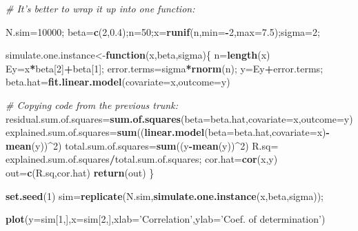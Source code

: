 \documentclass[12pt,]{book}
\newenvironment{Shaded}{\begin{snugshade}}{\end{snugshade}}
\newcommand{\KeywordTok}[1]{\textcolor[rgb]{0.13,0.29,0.53}{\textbf{#1}}}
\newcommand{\DataTypeTok}[1]{\textcolor[rgb]{0.13,0.29,0.53}{#1}}
\newcommand{\DecValTok}[1]{\textcolor[rgb]{0.00,0.00,0.81}{#1}}
\newcommand{\FloatTok}[1]{\textcolor[rgb]{0.00,0.00,0.81}{#1}}
\newcommand{\StringTok}[1]{\textcolor[rgb]{0.31,0.60,0.02}{#1}}
\newcommand{\CommentTok}[1]{\textcolor[rgb]{0.56,0.35,0.01}{\textit{#1}}}
\newcommand{\ControlFlowTok}[1]{\textcolor[rgb]{0.13,0.29,0.53}{\textbf{#1}}}
\newcommand{\OperatorTok}[1]{\textcolor[rgb]{0.81,0.36,0.00}{\textbf{#1}}}
\newcommand{\NormalTok}[1]{#1}
\begin{document}
\begin{Shaded}
\begin{Highlighting}[]
\CommentTok{# It's better to wrap it up into one function:}

\NormalTok{N.sim=}\DecValTok{10000}\NormalTok{;}
\NormalTok{beta=}\KeywordTok{c}\NormalTok{(}\DecValTok{2}\NormalTok{,}\FloatTok{0.4}\NormalTok{);n=}\DecValTok{50}\NormalTok{;x=}\KeywordTok{runif}\NormalTok{(n,}\DataTypeTok{min=}\OperatorTok{-}\DecValTok{2}\NormalTok{,}\DataTypeTok{max=}\FloatTok{7.5}\NormalTok{);sigma=}\DecValTok{2}\NormalTok{;}

\NormalTok{simulate.one.instance<-}\ControlFlowTok{function}\NormalTok{(x,beta,sigma)\{}
\NormalTok{  n=}\KeywordTok{length}\NormalTok{(x)}
\NormalTok{ Ey=x}\OperatorTok{*}\NormalTok{beta[}\DecValTok{2}\NormalTok{]}\OperatorTok{+}\NormalTok{beta[}\DecValTok{1}\NormalTok{];}
\NormalTok{  error.terms=sigma}\OperatorTok{*}\KeywordTok{rnorm}\NormalTok{(n);}
\NormalTok{  y=Ey}\OperatorTok{+}\NormalTok{error.terms;}
\NormalTok{  beta.hat=}\KeywordTok{fit.linear.model}\NormalTok{(}\DataTypeTok{covariate=}\NormalTok{x,}\DataTypeTok{outcome=}\NormalTok{y)}

  \CommentTok{# Copying code from the previous trunk:}
\NormalTok{  residual.sum.of.squares=}\KeywordTok{sum.of.squares}\NormalTok{(}\DataTypeTok{beta=}\NormalTok{beta.hat,}\DataTypeTok{covariate=}\NormalTok{x,}\DataTypeTok{outcome=}\NormalTok{y)}
\NormalTok{  explained.sum.of.squares=}\KeywordTok{sum}\NormalTok{((}\KeywordTok{linear.model}\NormalTok{(}\DataTypeTok{beta=}\NormalTok{beta.hat,}\DataTypeTok{covariate=}\NormalTok{x)}\OperatorTok{-}\KeywordTok{mean}\NormalTok{(y))}\OperatorTok{^}\DecValTok{2}\NormalTok{)}
\NormalTok{  total.sum.of.squares=}\KeywordTok{sum}\NormalTok{((y}\OperatorTok{-}\KeywordTok{mean}\NormalTok{(y))}\OperatorTok{^}\DecValTok{2}\NormalTok{)}
\NormalTok{  R.sq=}\StringTok{ }\NormalTok{explained.sum.of.squares}\OperatorTok{/}\NormalTok{total.sum.of.squares;}
\NormalTok{  cor.hat=}\KeywordTok{cor}\NormalTok{(x,y)}
\NormalTok{  out=}\KeywordTok{c}\NormalTok{(R.sq,cor.hat)}
  \KeywordTok{return}\NormalTok{(out)}
\NormalTok{\}}

\KeywordTok{set.seed}\NormalTok{(}\DecValTok{1}\NormalTok{)}
\NormalTok{sim=}\KeywordTok{replicate}\NormalTok{(N.sim,}\KeywordTok{simulate.one.instance}\NormalTok{(x,beta,sigma));}

\KeywordTok{plot}\NormalTok{(}\DataTypeTok{y=}\NormalTok{sim[}\DecValTok{1}\NormalTok{,],}\DataTypeTok{x=}\NormalTok{sim[}\DecValTok{2}\NormalTok{,],}\DataTypeTok{xlab=}\StringTok{'Correlation'}\NormalTok{,}\DataTypeTok{ylab=}\StringTok{'Coef. of determination'}\NormalTok{)}
\end{Highlighting}
\end{Shaded}
\end{document}
